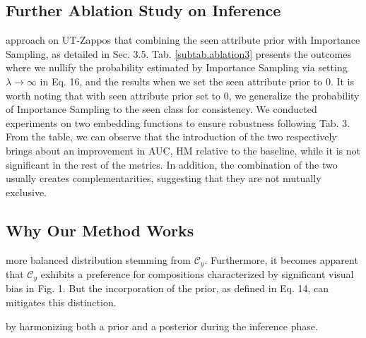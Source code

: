 \documentclass[letterpaper]{article} %
\theoremstyle{definition}
\begin{document}
\subsection{Further Ablation Study on Inference}
 approach on UT-Zappos that combining the seen attribute prior with Importance Sampling, as detailed in Sec. 3.5. Tab. \ref{subtab.ablation3} presents the outcomes where we nullify the probability estimated by Importance Sampling via setting $\lambda \rightarrow \infty $ in Eq. 16, and the results when we set the seen attribute prior to $0$. It is worth noting that with seen attribute prior set to 0, we generalize the probability of Importance Sampling to the seen class for consistency. We conducted experiments on two embedding functions to ensure robustness following Tab. 3. From the table, we can observe that the introduction of the two respectively brings about an improvement in AUC, HM relative to the baseline, while it is not significant in the rest of the metrics. In addition, the combination of the two usually creates complementarities, suggesting that they are not mutually exclusive.


\subsection{Why Our Method Works}
 more balanced distribution stemming from $\mathcal{C}_{y}$. Furthermore, it becomes apparent that $\mathcal{C}_y$ exhibits a preference for compositions characterized by significant visual bias in Fig. 1. But the incorporation of the prior, as defined in Eq. 14, can mitigates this distinction.

 by harmonizing both a prior and a posterior during the inference phase.
\end{document}
